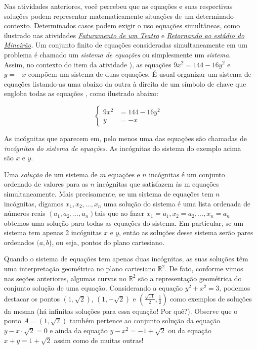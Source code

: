 Nas atividades anteriores, você percebeu que as equações e suas respectivas soluções podem representar matematicamente situações de um determinado contexto. Determinados casos podem exigir o uso equações simultâneas, como ilustrado nas atividades \hyperref[teatro]{\textit{Faturamento de um Teatro}} e \hyperref[estadio2]{\textit{Retornando ao estádio do Mineirão}}. Um conjunto finito de equações consideradas simultaneamente em um problema é chamado um \emph{sistema de equações} ou simplesmente um \emph{sistema}. Assim, no contexto do item  da atividade ), as equações $9x^2 = 144 - 16y^2$ e $y = -x$ compõem um sistema de duas equações. É usual organizar um sistema de equações listando-as uma abaixo da outra à direita de um símbolo de chave que engloba todas as equações , como ilustrado abaixo:

\begin{equation*}
\left\{
\begin{aligned}
9x^2&=144-16y^2\\
y&=-x
\end{aligned}
\right.
\end{equation*}

As incógnitas que aparecem em, pelo menos uma das equações são chamadas de \emph{incógnitas do sistema de equações}. As incógnitas do sistema do exemplo acima são $x$ e $y$.
 
Uma \emph{solução} de um sistema de $m$ equações e $n$ incógnitas é um conjunto ordenado de valores para as $n$ incógnitas que satisfazem às m equações simultaneamente.  Mais precisamente, se um sistema de equações tem $n$ incógnitas, digamos $x_1, x_2, \ldots, x_n$ uma solução do sistema é uma lista ordenada de números reais $(a_1, a_2, \ldots, a_n)$tais que ao fazer $x_1 = a_1 , x_2 = a_2, \ldots, x_n = a_n$ obtemos uma solução para todas as equações do sistema. Em particular, se um sistema tem apenas 2 incógnitas $x$ e $y$, então as soluções desse sistema serão pares ordenados $(a,b$), ou seja, pontos do plano cartesiano.

Quando o sistema de equações tem apenas duas incógnitas, as suas soluções têm uma interpretação geométrica no plano cartesiano $\mathbb{R}^2$. De fato, conforme vimos nas seções anteriores, algumas curvas no $\mathbb{R}^2$ são a representação geométrica do conjunto solução de uma equação. Considerando a equação $y^2 + x^2 = 3$, podemos destacar os pontos $(1, \sqrt{2})$, $(1, - \sqrt{2})$ e $(\frac{\sqrt{11}}{2}, \frac{1}{2})$ como exemplos de soluções da mesma (há infinitas soluções para essa equação! Por quê?). Observe que o ponto $A = (1, \sqrt{2})$ também pertence ao conjunto solução da equação $y - x\cdot \sqrt{2} = 0$ e ainda da equação $y - x^2 = -1 + \sqrt{2}$ ou da equação $x + y = 1 + \sqrt{2}$ assim como de muitas outras!

